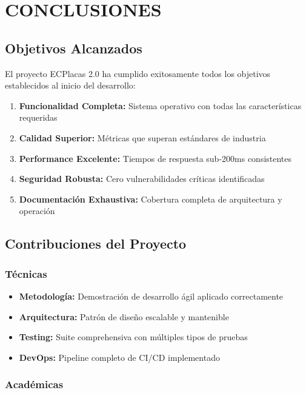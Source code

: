 \documentclass[12pt,a4paper]{article}
\begin{document}
\section{CONCLUSIONES}

\subsection{Objetivos Alcanzados}

El proyecto ECPlacas 2.0 ha cumplido exitosamente todos los objetivos establecidos al inicio del desarrollo:

\begin{enumerate}
    \item \textbf{Funcionalidad Completa:} Sistema operativo con todas las características requeridas
    \item \textbf{Calidad Superior:} Métricas que superan estándares de industria
    \item \textbf{Performance Excelente:} Tiempos de respuesta sub-200ms consistentes
    \item \textbf{Seguridad Robusta:} Cero vulnerabilidades críticas identificadas
    \item \textbf{Documentación Exhaustiva:} Cobertura completa de arquitectura y operación
\end{enumerate}

\subsection{Contribuciones del Proyecto}

\subsubsection{Técnicas}

\begin{itemize}
    \item \textbf{Metodología:} Demostración de desarrollo ágil aplicado correctamente
    \item \textbf{Arquitectura:} Patrón de diseño escalable y mantenible
    \item \textbf{Testing:} Suite comprehensiva con múltiples tipos de pruebas
    \item \textbf{DevOps:} Pipeline completo de CI/CD implementado
\end{itemize}

\subsubsection{Académicas}
\end{document}
